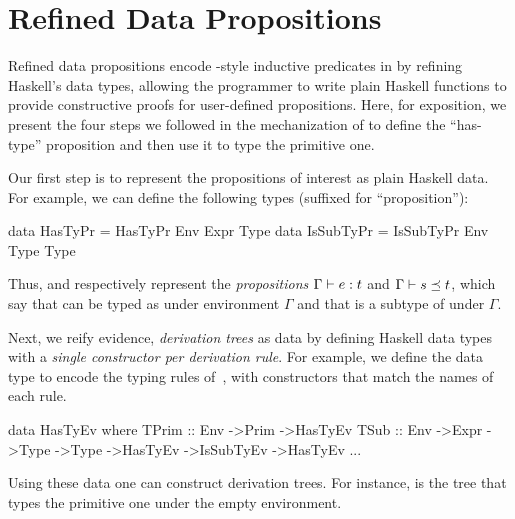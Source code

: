 \section{Refined Data Propositions}
\label{sec:data-props}
%
Refined data propositions encode \coq-style
inductive predicates in \lh by refining Haskell's 
data types, allowing the programmer to write plain
Haskell functions to provide constructive proofs 
for user-defined propositions.
Here, for exposition, we present the four steps we followed  
in the mechanization of \sysrf to 
define the ``has-type'' proposition
and then use it to type the primitive one. 

%
Our first step is to represent the propositions
of interest as plain Haskell data.
%
For example, we can define the following types 
(suffixed  for ``proposition''):
%
\begin{mcode}
    data HasTyPr   = HasTyPr    Env  Expr Type
    data IsSubTyPr = IsSubTyPr  Env  Type Type
\end{mcode}
%
Thus,  and 
respectively represent the \emph{propositions} 
${\Gamma} \vdash {e} : {t}$ and 
${\Gamma} \vdash s \preceq t$,
which say
that  can be typed as  under environment $\Gamma$ and
that  is a subtype of  under $\Gamma$.

%
Next, we reify evidence, \ie \emph{derivation trees}
as data by defining Haskell data types with a
\emph{single constructor per derivation rule}.
%
For example, we define the data type 
to encode the typing rules of~, 
with constructors that match the names of each rule.
%
\begin{mcode}
  data HasTyEv where
    TPrim :: Env ->Prim ->HasTyEv
    TSub  :: Env ->Expr ->Type ->Type ->HasTyEv ->IsSubTyEv ->HasTyEv
    ...
\end{mcode}
Using these data one can construct derivation trees. 
For instance,  
 is the tree that types 
the primitive one under the empty environment. 

